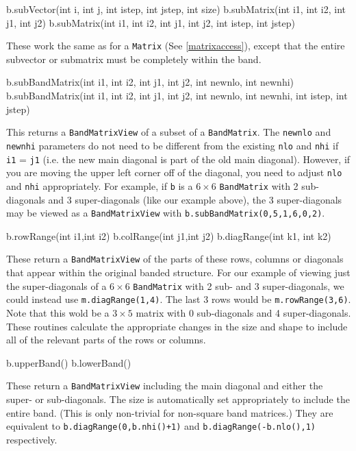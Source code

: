 \documentclass[twoside,letterpaper,11pt]{article}
\renewcommand{\tt}[1]{{\lstinline {#1}}}
\begin{document}
\begin{tmvcode}
b.subVector(int i, int j, int istep, int jstep, int size)
b.subMatrix(int i1, int i2, int j1, int j2)
b.subMatrix(int i1, int i2, int j1, int j2, int istep, int jstep)
\end{tmvcode}
These work the same as for a \tt{Matrix}
(See \ref{matrixaccess}),
except that the entire
subvector or submatrix must be completely within the band.
\label{bandmatrixaccess}

\begin{tmvcode}
b.subBandMatrix(int i1, int i2, int j1, int j2, int newnlo, int newnhi)
b.subBandMatrix(int i1, int i2, int j1, int j2, int newnlo, int newnhi, 
      int istep, int jstep)
\end{tmvcode}
This returns a \tt{BandMatrixView} of a subset of a \tt{BandMatrix}.
The \tt{newnlo} and \tt{newnhi} parameters do not need to be different
from the existing \tt{nlo} and \tt{nhi} if \tt{i1} = \tt{j1} 
(i.e. the new main diagonal
is part of the old main diagonal).  However, if you are moving the upper left
corner off of the diagonal, you need to adjust \tt{nlo} and \tt{nhi} appropriately.
For example, if \tt{b} is a $6 \times 6$ \tt{BandMatrix} with 2 sub-diagonals and 
3 super-diagonals
(like our example above), the 3 super-diagonals may be viewed as a \tt{BandMatrixView}
with \tt{b.subBandMatrix(0,5,1,6,0,2)}.

\begin{tmvcode}
b.rowRange(int i1,int i2)
b.colRange(int j1,int j2)
b.diagRange(int k1, int k2)
\end{tmvcode}
These return a \tt{BandMatrixView} of the parts of these rows,
columns or diagonals that
appear within the original banded structure.  For our example of viewing just
the super-diagonals of a $6 \times 6$ \tt{BandMatrix} with 2 sub- and 
3 super-diagonals, we
could instead use \tt{m.diagRange(1,4)}.  The last 3 rows would be \tt{m.rowRange(3,6)}.
Note that this wold be a $3 \times 5$ matrix with 0 sub-diagonals and 
4 super-diagonals.
These routines calculate the appropriate changes in the size and shape to include
all of the relevant parts of the rows or columns.

\begin{tmvcode}
b.upperBand()
b.lowerBand()
\end{tmvcode}
These return a \tt{BandMatrixView} including the main diagonal and either the
super- or sub-diagonals.  The size
is automatically set appropriately to include the entire band.  (This is only
non-trivial for non-square band matrices.)  They are equivalent to
\tt{b.diagRange(0,b.nhi()+1)} and \tt{b.diagRange(-b.nlo(),1)} respectively.
\end{document}
